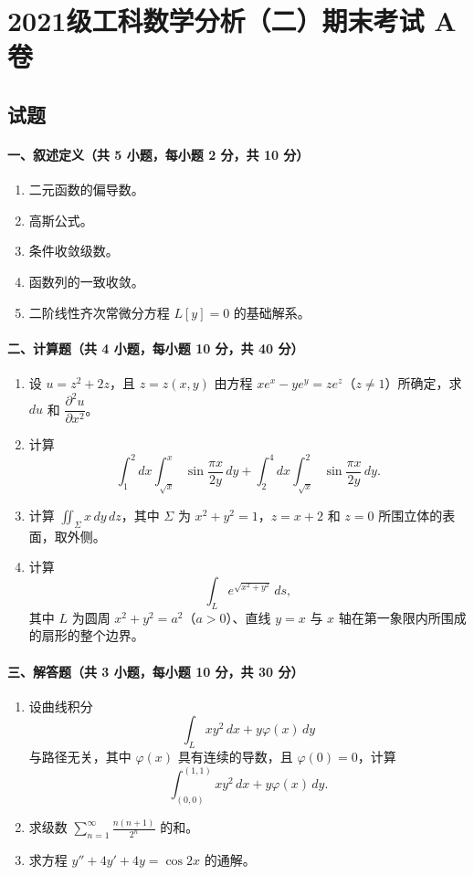 \section{2021级工科数学分析（二）期末考试 A 卷}

\subsection{试题}

\paragraph{一、叙述定义（共 5 小题，每小题 2 分，共 10 分）}
\begin{enumerate}
  \item 二元函数的偏导数。
  \item 高斯公式。
  \item 条件收敛级数。
  \item 函数列的一致收敛。
  \item 二阶线性齐次常微分方程 $L[y]=0$ 的基础解系。
\end{enumerate}

\paragraph{二、计算题（共 4 小题，每小题 10 分，共 40 分）}
\begin{enumerate}
  \item 设 $u=z^2+2z$，且 $z=z(x,y)$ 由方程 $xe^x-ye^y=ze^z$（$z\ne 1$）所确定，求 $du$ 和 $\dfrac{\partial^2u}{\partial x^2}$。
  \item 计算
  \[
    \int_1^2 dx\int_{\sqrt{x}}^x \sin\frac{\pi x}{2y}\,dy
    +\int_2^4 dx\int_{\sqrt{x}}^2 \sin\frac{\pi x}{2y}\,dy .
  \]
  \item 计算 $\iint_\Sigma x\,dy\,dz$，其中 $\Sigma$ 为 $x^2+y^2=1$，$z=x+2$ 和 $z=0$ 所围立体的表面，取外侧。
  \item 计算
  \[
    \int_L e^{\sqrt{x^2+y^2}}\,ds,
  \]
  其中 $L$ 为圆周 $x^2+y^2=a^2$（$a>0$）、直线 $y=x$ 与 $x$ 轴在第一象限内所围成的扇形的整个边界。
\end{enumerate}

\paragraph{三、解答题（共 3 小题，每小题 10 分，共 30 分）}
\begin{enumerate}
  \item 设曲线积分
  \[
    \int_L xy^2\,dx+y\varphi(x)\,dy
  \]
  与路径无关，其中 $\varphi(x)$ 具有连续的导数，且 $\varphi(0)=0$，计算
  \[
    \int_{(0,0)}^{(1,1)} xy^2\,dx+y\varphi(x)\,dy .
  \]
  \item 求级数 $\displaystyle \sum_{n=1}^\infty \frac{n(n+1)}{2^n}$ 的和。
  \item 求方程 $y''+4y'+4y=\cos 2x$ 的通解。
\end{enumerate}

